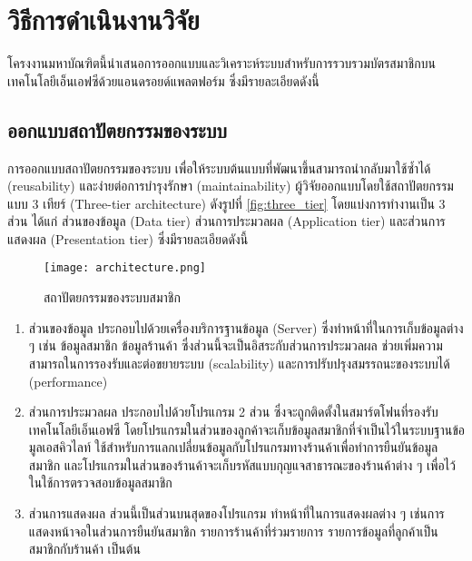 \documentclass[12pt,a4paper,twocolumn]{article}
\begin{document}

\section{วิธีการดำเนินงานวิจัย}
โครงงานมหาบัณฑิตนี้นําเสนอการออกแบบและวิเคราะห์ระบบสำหรับการรวบรวมบัตรสมาชิกบนเทคโนโลยีเอ็นเอฟซีด้วยแอนดรอยด์แพลตฟอร์ม ซึ่งมีรายละเอียดดังนี้

\subsection{ออกแบบสถาปัตยกรรมของระบบ}
การออกแบบสถาปัตยกรรมของระบบ เพื่อให้ระบบต้นแบบที่พัฒนาขึ้นสามารถนำกลับมาใช้ซ้ำได้ (reusability) และง่ายต่อการบำรุงรักษา (maintainability) ผู้วิจัยออกแบบโดยใช้สถาปัตยกรรมแบบ 3 เทียร์ (Three-tier architecture) ดังรูปที่ \ref{fig:three_tier} โดยแบ่งการทำงานเป็น 3 ส่วน ได้แก่ ส่วนของข้อมูล (Data tier) ส่วนการประมวลผล (Application tier) และส่วนการแสดงผล (Presentation tier) ซึ่งมีรายละเอียดดังนี้

\begin{figure}[ht!]
\centering
\texttt{[image: architecture.png]}
\caption{สถาปัตยกรรมของระบบสมาชิก} \label{fig:three_tier}
\label{overflow}
\end{figure}

\begin{enumerate} 
\item ส่วนของข้อมูล ประกอบไปด้วยเครื่องบริการฐานข้อมูล (Server) ซึ่งทำหน้าที่ในการเก็บข้อมูลต่าง ๆ เช่น ข้อมูลสมาชิก ข้อมูลร้านค้า ซึ่งส่วนนี้จะเป็นอิสระกับส่วนการประมวลผล ช่วยเพิ่มความสามารถในการรองรับและต่อขยายระบบ (scalability) และการปรับปรุงสมรรถนะของระบบได้ (performance)

\item ส่วนการประมวลผล ประกอบไปด้วยโปรแกรม 2 ส่วน ซึ่งจะถูกติดตั้งในสมาร์ตโฟนที่รองรับเทคโนโลยีเอ็นเอฟซี โดยโปรแกรมในส่วนของลูกค้าจะเก็บข้อมูลสมาชิกที่จำเป็นไว้ในระบบฐานข้อมูลเอสคิวไลท์ ใช้สำหรับการแลกเปลี่ยนข้อมูลกับโปรแกรมทางร้านค้าเพื่อทำการยืนยันข้อมูลสมาชิก และโปรแกรมในส่วนของร้านค้าจะเก็บรหัสแบบกุญแจสาธารณะของร้านค้าต่าง ๆ เพื่อไว้ในใช้การตรวจสอบข้อมูลสมาชิก

\item ส่วนการแสดงผล ส่วนนี้เป็นส่วนบนสุดของโปรแกรม ทำหน้าที่ในการแสดงผลต่าง ๆ เช่นการแสดงหน้าจอในส่วนการยืนยันสมาชิก รายการร้านค้าที่ร่วมรายการ รายการข้อมูลที่ลูกค้าเป็นสมาชิกกับร้านค้า เป็นต้น
\end{enumerate}
\end{document}
